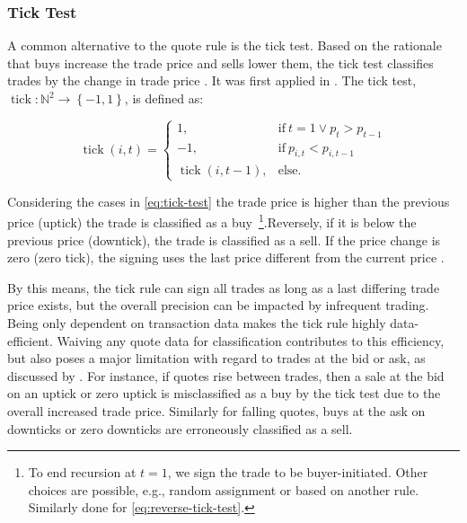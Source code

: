 \subsubsection{Tick Test}\label{sec:tick-test}

A common alternative to the quote rule is the tick test. Based on the rationale that buys increase the trade price and sells lower them, the tick test classifies trades by the change in trade price \autocite[][271]{easleyDiscerningInformationTrade2016}. It was first applied in \textcites[][244]{holthausenEffectLargeBlock1987}[][240]{hasbrouckTradesQuotesInventories1988}. The tick test, $\operatorname{tick}\colon \mathbb{N}^2 \to \left\{-1, 1\right\}$, is defined as:

\begin{equation}
\operatorname{tick}(i, t)=
\begin{cases}
1, & \text{if}\ t=1 \lor p_{t}>p_{t-1} \\
-1,  & \text{if}\ p_{i, t} < p_{i, t-1}\\
\operatorname{tick}(i, t-1), & \text{else}.
\end{cases}
\label{eq:tick-test}
\end{equation}

Considering the cases in \cref{eq:tick-test} the trade price is higher than the previous price (uptick) the trade is classified as a buy~\footnote{To end recursion at $t=1$, we sign the trade to be buyer-initiated. Other choices are possible, e.g., random assignment or based on another rule. Similarly done for \cref{eq:reverse-tick-test}.}.Reversely, if it is below the previous price (downtick), the trade is classified as a sell. If the price change is zero (zero tick), the signing uses the last price different from the current price \autocite[][3]{leeInferringTradeDirection1991}.

By this means, the tick rule can sign all trades as long as a last differing trade price exists, but the overall precision can be impacted by infrequent trading. Being only dependent on transaction data makes the tick rule highly data-efficient. Waiving any quote data for classification contributes to this efficiency, but also poses a major limitation with regard to trades at the bid or ask, as discussed by \textcite[][557--558]{finucaneDirectTestMethods2000}. For instance, if quotes rise between trades, then a sale at the bid on an uptick or zero uptick is misclassified as a buy by the tick test due to the overall increased trade price. Similarly for falling quotes, buys at the ask on downticks or zero downticks are erroneously classified as a sell.

